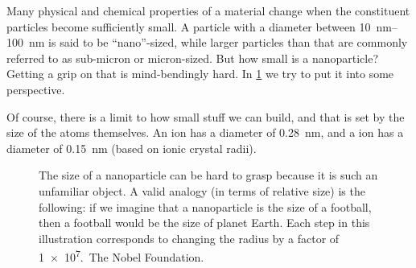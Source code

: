 \documentclass[webedition,openright,titles,swedish,english]{LuaUUThesis}\usepackage[]{graphicx}\usepackage[]{xcolor}
\begin{document}
Many physical and chemical properties of a material change when
the constituent particles become sufficiently small.
A particle with a diameter between \qtyrange{10}{100}{\nm} is said to be
\enquote{nano}-sized, while larger particles than that are commonly referred
to as sub-micron or micron-sized.
But how small is a nanoparticle?
Getting a grip on that is mind-bendingly hard.
In \cref{fig:0100-nanoparticles-are-small} we try to put it into some perspective.

Of course, there is a limit to how small stuff we can build, and that is set by the size
of the atoms themselves. An \oxide{} ion has a diameter of \qty{0.28}{\nm},
and a  ion has a diameter of \qty{0.15}{\nm} (based on ionic crystal radii).

%

\begin{figure}[tbp]
\centering
\caption[A nanoparticle is very small]{%
   The size of a nanoparticle can be hard to grasp because it is such an unfamiliar
   object. A valid analogy (in terms of relative size) is the following:
   if we imagine that a nanoparticle is the size of a football, then a football
   would be the size of planet Earth.
   Each step in this illustration corresponds to changing
   the radius by a factor of \num[retain-unity-mantissa=false]{1e7}.
   {\footnotesize\CCBYND[\scriptsize]\,The Nobel Foundation.}
}
\label{fig:0100-nanoparticles-are-small}
\end{figure}
\end{document}
